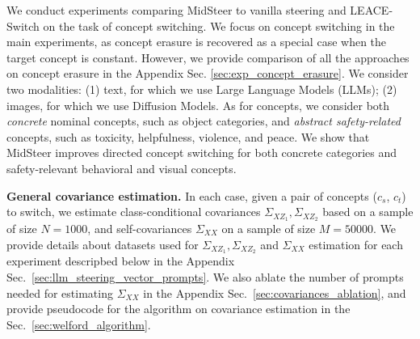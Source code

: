 
We conduct experiments comparing MidSteer to vanilla steering and LEACE-Switch on the task of concept switching. We focus on concept switching in the main experiments, as concept erasure is recovered as a special case when the target concept is constant. However, we provide comparison of all the approaches on concept erasure in the Appendix Sec. \ref{sec:exp_concept_erasure}. We consider two modalities: (1) text, for which we use Large Language Models (LLMs); (2) images, for which we use Diffusion Models. As for concepts, we consider both \emph{concrete} nominal concepts, such as object categories, and \emph{abstract safety-related} concepts, such as toxicity, helpfulness, violence, and peace. We show that MidSteer improves directed concept switching for both concrete categories and safety-relevant behavioral and visual concepts.





\noindent \textbf{General covariance estimation.}
In each case, given a pair of concepts ($c_s$, $c_t$) to switch, we estimate class-conditional covariances $\Sigma_{XZ_1}, \Sigma_{XZ_2}$ based on a sample of size $N=1000$, and self-covariances $\Sigma_{XX}$ on a sample of size $M=50000$. We provide details about datasets used for $\Sigma_{XZ_1}, \Sigma_{XZ_2}$ and $\Sigma_{XX}$ estimation for each experiment descripbed below in the Appendix Sec.~\ref{sec:llm_steering_vector_prompts}. We also ablate the number of prompts needed for estimating $\Sigma_{XX}$ in the Appendix Sec.~\ref{sec:covariances_ablation}, and provide pseudocode for the algorithm on covariance estimation in the Sec.~\ref{sec:welford_algorithm}.


